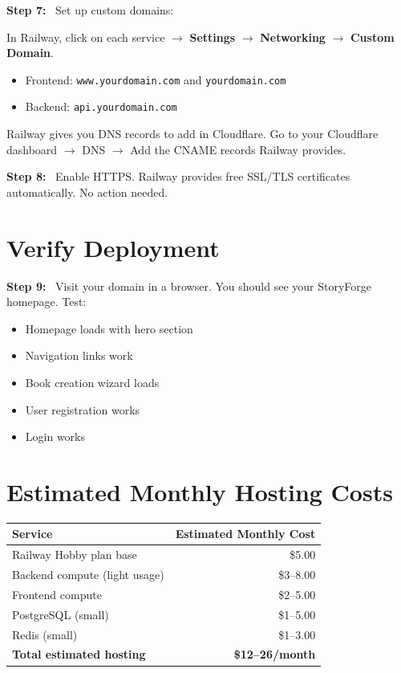 \documentclass[12pt, letterpaper, oneside]{book}
\newcommand{\step}[1]{\noindent\textbf{\textcolor{primary}{Step #1:}}~}
\begin{document}
\step{7} Set up custom domains:
\begin{actionbox}
In Railway, click on each service $\rightarrow$ \textbf{Settings} $\rightarrow$ \textbf{Networking} $\rightarrow$ \textbf{Custom Domain}.\\[4pt]
\begin{itemize}[leftmargin=1.5em]
  \item Frontend: \texttt{www.yourdomain.com} and \texttt{yourdomain.com}
  \item Backend: \texttt{api.yourdomain.com}
\end{itemize}
Railway gives you DNS records to add in Cloudflare. Go to your Cloudflare dashboard $\rightarrow$ DNS $\rightarrow$ Add the CNAME records Railway provides.
\end{actionbox}

\step{8} Enable HTTPS. Railway provides free SSL/TLS certificates automatically. No action needed.

\section{Verify Deployment}

\step{9} Visit your domain in a browser. You should see your StoryForge homepage. Test:
\begin{itemize}[leftmargin=2em]
  \item[$\square$] Homepage loads with hero section
  \item[$\square$] Navigation links work
  \item[$\square$] Book creation wizard loads
  \item[$\square$] User registration works
  \item[$\square$] Login works
\end{itemize}

\section{Estimated Monthly Hosting Costs}

\begin{table}[H]
\centering
\begin{tabular}{lr}
\toprule
\textbf{Service} & \textbf{Estimated Monthly Cost} \\
\midrule
Railway Hobby plan base & \$5.00 \\
Backend compute (light usage) & \$3--8.00 \\
Frontend compute & \$2--5.00 \\
PostgreSQL (small) & \$1--5.00 \\
Redis (small) & \$1--3.00 \\
\midrule
\textbf{Total estimated hosting} & \textbf{\$12--26/month} \\
\bottomrule
\end{tabular}
\end{table}
\end{document}
